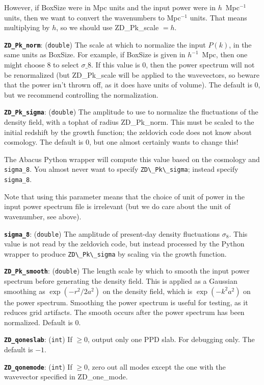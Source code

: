 \documentclass[11pt,preprint]{aastex}
\newcommand{\param}[2]{\medskip\noindent\textbf{\texttt{#1}}: ({\tt #2}) }
\begin{document}
However, if BoxSize were in Mpc units and the input power were in 
$h$~Mpc$^{-1}$ units, then we want to convert the wavenumbers to 
Mpc$^{-1}$ units.  That means multiplying by $h$, so we should use
ZD\_Pk\_scale $=h$.

\param{ZD\_Pk\_norm}{double} The scale at which to normalize the input
$P(k)$, in the same units as BoxSize.  For example, if BoxSize is
given in $h^{-1}$~Mpc, then one might choose 8 to select $\sigma\_8$.
If this value is 0, then the power spectrum will not be renormalized
(but ZD\_Pk\_scale will be applied to the wavevectors, so beware that
the power isn't thrown off, as it does have units of volume).  The
default is 0, but we recommend controlling the normalization.

\param{ZD\_Pk\_sigma}{double} The amplitude to use to normalize the
fluctuations of the density field, with a tophat of radius ZD\_Pk\_norm.
This must be scaled to the initial redshift by the growth function; 
the zeldovich code does not know about cosmology.  The default is 0,
but one almost certainly wants to change this!

The Abacus Python wrapper will compute this value based on the cosmology and \verb|sigma_8|.  You almost never want to specify \verb|ZD\_Pk\_sigma|; instead specify \verb|sigma_8|.

Note that using this parameter means that the choice of unit of power 
in the input power spectrum file is irrelevant (but we do care about
the unit of wavenumber, see above).

\param{sigma\_8}{double} The amplitude of present-day density fluctuations $\sigma_8$.  This value is not read by the zeldovich code, but instead processed by the Python wrapper to produce \verb|ZD\_Pk\_sigma| by scaling via the growth function.

\param{ZD\_Pk\_smooth}{double} The length scale by which to smooth the input 
power spectrum before generating the density field.  This is applied as
a Gaussian smoothing as $\exp(-r^2/2a^2)$ on the density field, which is
 $\exp(-k^2 a^2)$ on the power spectrum.  Smoothing the power spectrum 
is useful for testing, as it reduces grid artifacts.  The smooth occurs
after the power spectrum has been normalized.  Default is 0.

\param{ZD\_qoneslab}{int} If $\ge0$, output only one PPD slab.  For debugging only.
The default is $-1$.

\param{ZD\_qonemode}{int} If $\ge0$, zero out all modes except the one with the wavevector specified in ZD\_one\_mode.
\end{document}
